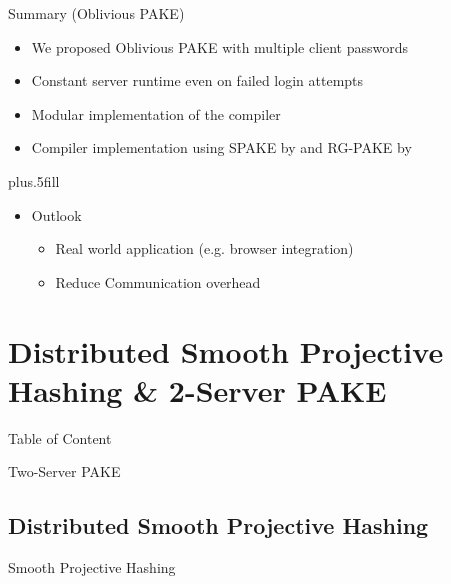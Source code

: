 \documentclass[notes,xcolor=dvipsnames]{beamer}
\begin{document}
\begin{frame}{Summary (Oblivious PAKE)}

  \begin{itemize}
  \item We proposed \alert{Oblivious PAKE} with multiple client passwords
  \item \alert{Constant server runtime} even on failed login attempts
  \item \alert{Modular implementation} of the compiler
  \item Compiler implementation using SPAKE by \cite{Abdalla2005} and RG-PAKE by \cite{Gennaro2008}
  \end{itemize}
  
  \vskip0pt plus.5fill
  \begin{itemize}
  \item
    Outlook
    \begin{itemize}
    \item Real world application (e.g. browser integration)
    \item Reduce Communication overhead
    \end{itemize}
  \end{itemize}
\end{frame}


\section{Distributed Smooth Projective Hashing \& 2-Server PAKE}

\begin{frame}{Table of Content}
\tableofcontents[currentsection]
\end{frame}

\begin{frame}{Two-Server PAKE}

\end{frame}

\subsection{Distributed Smooth Projective Hashing}

\begin{frame}{Smooth Projective Hashing}

\end{frame}
\end{document}
